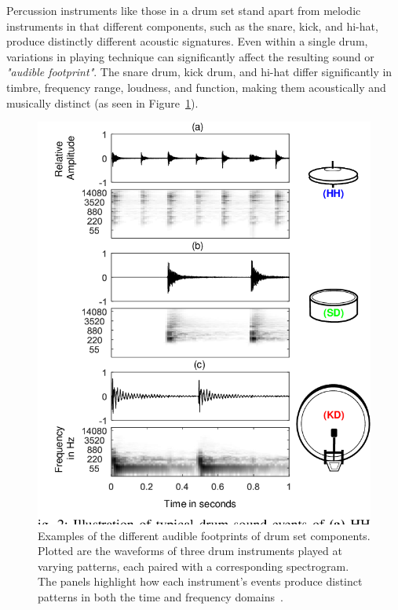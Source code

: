 Percussion instruments like those in a drum set stand apart from melodic instruments in that different components, such as the snare, kick, and hi-hat, produce distinctly different acoustic signatures. Even within a single drum, variations in playing technique can significantly affect the resulting sound or \textit{"audible footprint"}. The snare drum, kick drum, and hi-hat differ significantly in timbre, frequency range, loudness, and function, making them acoustically and musically distinct (as seen in Figure~\ref{DrumsetTimbreFigure}).

\begin{figure}[H]
    \centering
    \includegraphics[scale=0.6, trim={0 1cm 0 0},clip]{figures/drumsettimbre}
    \caption{Examples of the different audible footprints of drum set components. Plotted are the waveforms of three drum instruments played at varying patterns, each paired with a corresponding spectrogram. The panels highlight how each instrument's events produce distinct patterns in both the time and frequency domains~\cite{8350302}.}
    \label{DrumsetTimbreFigure}
\end{figure}

